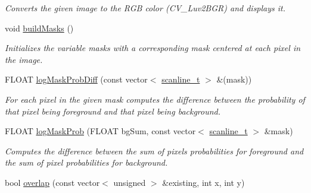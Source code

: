 \begin{DoxyCompactItemize}
\begin{DoxyCompactList}\small\item\em Converts the given image to the RGB color (CV\_\-Luv2BGR) and displays it. \item\end{DoxyCompactList}\item 
\hypertarget{classfindperson_a75c79495f6bea5917afce73830352a4c}{
void \hyperlink{classfindperson_a75c79495f6bea5917afce73830352a4c}{buildMasks} ()}
\label{classfindperson_a75c79495f6bea5917afce73830352a4c}

\begin{DoxyCompactList}\small\item\em Initializes the variable {\ttfamily masks} with a corresponding mask centered at each pixel in the image. \item\end{DoxyCompactList}\item 
\hypertarget{classfindperson_aba30f91bb709a9ed247c80f3a4c827d5}{
FLOAT \hyperlink{classfindperson_aba30f91bb709a9ed247c80f3a4c827d5}{logMaskProbDiff} (const vector$<$ \hyperlink{structscanline__t}{scanline\_\-t} $>$ \&(mask))}
\label{classfindperson_aba30f91bb709a9ed247c80f3a4c827d5}

\begin{DoxyCompactList}\small\item\em For each pixel in the given mask computes the difference between the probability of that pixel being foreground and that pixel being background. \item\end{DoxyCompactList}\item 
\hypertarget{classfindperson_ab92a2618bc71cef02194adb24833c0b3}{
FLOAT \hyperlink{classfindperson_ab92a2618bc71cef02194adb24833c0b3}{logMaskProb} (FLOAT bgSum, const vector$<$ \hyperlink{structscanline__t}{scanline\_\-t} $>$ \&mask)}
\label{classfindperson_ab92a2618bc71cef02194adb24833c0b3}

\begin{DoxyCompactList}\small\item\em Computes the difference between the sum of pixels probabilities for foreground and the sum of pixel probabilities for background. \item\end{DoxyCompactList}\item 
\hypertarget{classfindperson_aaf033810455a87eb5f32cfed75b5519e}{
bool \hyperlink{classfindperson_aaf033810455a87eb5f32cfed75b5519e}{overlap} (const vector$<$ unsigned $>$ \&existing, int x, int y)}
\label{classfindperson_aaf033810455a87eb5f32cfed75b5519e}


\end{DoxyCompactItemize}
